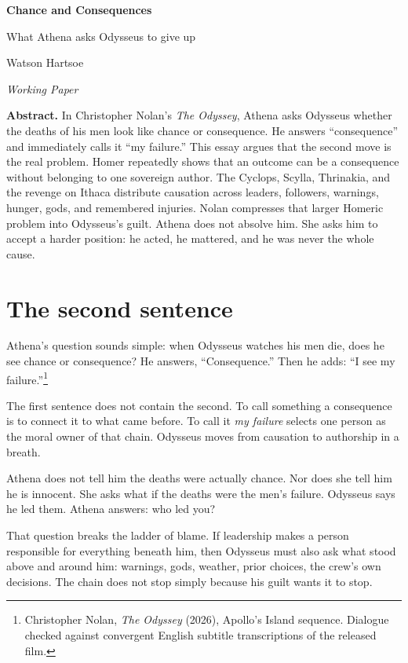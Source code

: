 \documentclass[11pt]{article}
\begin{document}
\begin{center}
{\LARGE\bfseries Chance and Consequences}\par
\vspace{0.2em}
{\large What Athena asks Odysseus to give up}\par
\vspace{0.65em}
Watson Hartsoe\par
\textit{Working Paper}\par
\end{center}

\vspace{0.45em}
\noindent\textbf{Abstract.} In Christopher Nolan's \textit{The Odyssey}, Athena asks Odysseus whether the deaths of his men look like chance or consequence. He answers ``consequence'' and immediately calls it ``my failure.'' This essay argues that the second move is the real problem. Homer repeatedly shows that an outcome can be a consequence without belonging to one sovereign author. The Cyclops, Scylla, Thrinakia, and the revenge on Ithaca distribute causation across leaders, followers, warnings, hunger, gods, and remembered injuries. Nolan compresses that larger Homeric problem into Odysseus's guilt. Athena does not absolve him. She asks him to accept a harder position: he acted, he mattered, and he was never the whole cause.

\section{The second sentence}

Athena's question sounds simple: when Odysseus watches his men die, does he see chance or consequence? He answers, ``Consequence.'' Then he adds: ``I see my failure.''\footnote{Christopher Nolan, \textit{The Odyssey} (2026), Apollo's Island sequence. Dialogue checked against convergent English subtitle transcriptions of the released film.}

The first sentence does not contain the second. To call something a consequence is to connect it to what came before. To call it \emph{my failure} selects one person as the moral owner of that chain. Odysseus moves from causation to authorship in a breath.

Athena does not tell him the deaths were actually chance. Nor does she tell him he is innocent. She asks what if the deaths were the men's failure. Odysseus says he led them. Athena answers: who led you?

That question breaks the ladder of blame. If leadership makes a person responsible for everything beneath him, then Odysseus must also ask what stood above and around him: warnings, gods, weather, prior choices, the crew's own decisions. The chain does not stop simply because his guilt wants it to stop.
\end{document}
